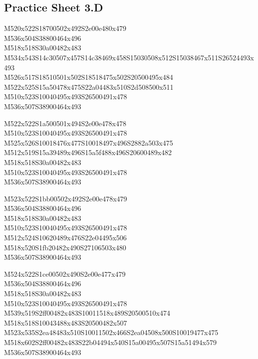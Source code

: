 \documentclass{article}
\begin{document}
\subsection{Practice Sheet 3.D}

\begin{multicols}{5}
\begin{center}
M520x522S18700502x492S2e00e480x479 %
\\M536x504S38800464x496 %
\\M518x518S30a00482x483 %
\\M534x543S14c30507x457S14c38469x458S15030508x512S15038467x511S26524493x493 %
\\M526x517S18510501x502S18518475x502S20500495x484 %
\\M522x525S15a50478x475S22a04483x510S2d508500x511 %
\\M510x523S10040495x493S26500491x478 %
\\M536x507S38900464x493 %
\vfil
\columnbreak

M522x522S1a500501x494S2e00e478x478 %
\\M510x523S10040495x493S26500491x478 %
\\M525x526S10018476x477S10018497x496S2882a503x475 %
\\M512x519S15a39489x496S15a5f488x496S20600489x482 %
\\M518x518S30a00482x483 %
\\M510x523S10040495x493S26500491x478 %
\\M536x507S38900464x493 %
\vfil
\columnbreak

M523x522S1bb00502x492S2e00e478x479 %
\\M536x504S38800464x496 %
\\M518x518S30a00482x483 %
\\M510x523S10040495x493S26500491x478 %
\\M512x524S10620489x476S22e04495x506 %
\\M518x520S1fb20482x490S27106503x480 %
\\M536x507S38900464x493 %
\vfil
\columnbreak

M524x522S1ce00502x490S2e00e477x479 %
\\M536x504S38800464x496 %
\\M518x518S30a00482x483 %
\\M510x523S10040495x493S26500491x478 %
\\M539x519S2ff00482x483S10011518x489S20500510x474 %
\\M518x518S10043488x483S20500482x507 %
\\M523x535S2ea48483x510S10011502x466S2ea04508x500S10019477x475 %
\\M518x602S2ff00482x483S22b04494x540S15a00495x507S15a51494x579 %
\\M536x507S38900464x493 %
\vfil
\columnbreak


\end{center}
\end{multicols}
\end{document}
